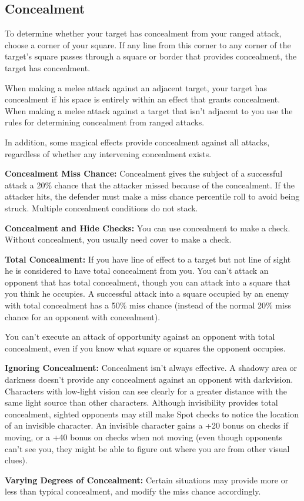 \subsection{Concealment}
To determine whether your target has concealment from your ranged attack, choose a corner of your square. If any line from this corner to any corner of the target's square passes through a square or border that provides concealment, the target has concealment.

When making a melee attack against an adjacent target, your target has concealment if his space is entirely within an effect that grants concealment. When making a melee attack against a target that isn't adjacent to you use the rules for determining concealment from ranged attacks.

In addition, some magical effects provide concealment against all attacks, regardless of whether any intervening concealment exists.

\textbf{Concealment Miss Chance:} Concealment gives the subject of a successful attack a 20\% chance that the attacker missed because of the concealment. If the attacker hits, the defender must make a miss chance percentile roll to avoid being struck. Multiple concealment conditions do not stack.

\textbf{Concealment and Hide Checks:} You can use concealment to make a  check. Without concealment, you usually need cover to make a  check.

\textbf{Total Concealment:} If you have line of effect to a target but not line of sight he is considered to have total concealment from you. You can't attack an opponent that has total concealment, though you can attack into a square that you think he occupies. A successful attack into a square occupied by an enemy with total concealment has a 50\% miss chance (instead of the normal 20\% miss chance for an opponent with concealment).

You can't execute an attack of opportunity against an opponent with total concealment, even if you know what square or squares the opponent occupies.

\textbf{Ignoring Concealment:} Concealment isn't always effective. A shadowy area or darkness doesn't provide any concealment against an opponent with darkvision. Characters with low-light vision can see clearly for a greater distance with the same light source than other characters. Although invisibility provides total concealment, sighted opponents may still make Spot checks to notice the location of an invisible character. An invisible character gains a +20 bonus on  checks if moving, or a +40 bonus on  checks when not moving (even though opponents can't see you, they might be able to figure out where you are from other visual clues).

\textbf{Varying Degrees of Concealment:} Certain situations may provide more or less than typical concealment, and modify the miss chance accordingly.